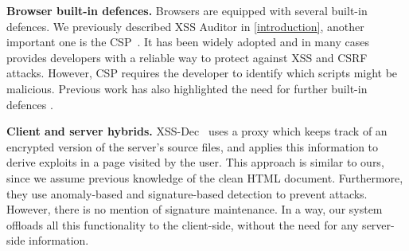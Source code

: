 \noindent \textbf{Browser built-in defences.}  Browsers are equipped
with several built-in defences. We previously described XSS
Auditor in \autoref{introduction}, another important one is the 
 \ac{CSP}~\cite{CSP}. It has been widely adopted and
in many cases provides developers with a reliable way to protect
against \ac{XSS} and \ac{CSRF} attacks. However, \ac{CSP} requires the developer to identify which scripts
might be malicious. Previous work has also highlighted the need for further built-in defences \cite{6825636}.

\noindent \textbf{Client and server hybrids.}
XSS-Dec~\cite{Sundareswaran:2012:XHS:2352970.2352994} uses a proxy which keeps track of an encrypted version of the server's source files, and applies this information to derive exploits in a page visited by the user. This approach is similar to ours, since we assume previous
knowledge of the clean HTML document. Furthermore, they use anomaly-based and signature-based detection to prevent attacks. However, there is no mention of signature maintenance. In a way, our system offloads all this functionality to the client-side, without the need for any server-side information.


